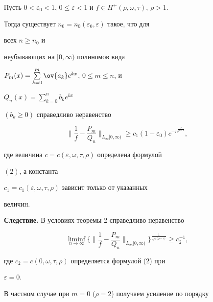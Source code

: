  


\begin{thm} 


Пусть $0<\varepsilon_0<1$, $0\le\varepsilon<1$ и $f\in 


H^+(\rho,\omega,\tau)$, $\rho>1$. 


Тогда существует $n_0=n_0(\varepsilon_0,\varepsilon)$ такое, что для 


всех $n\ge n_0$ и 


неубывающих на $[0,\infty)$ полиномов вида 


$P_m(x)=\sum\limits^m_{k=0}\ov{a_k}e^{kx}$, $0\le m\le n$, и 


$Q_n(x)=\sum\limits^n_{k=0}b_k e^{kx}$ 


$(b_k\ge0)$ справедливо неравенство 


\begin{equation} 


\bigg\|\frac{1}{f}-\frac{P_m}{Q_n}\bigg\|_{L_\infty[0,\infty)} 


\ge c_1(1-\varepsilon_0)c^{-n^{\frac{\rho}{\rho-1}}}, 


\end{equation} 


где величина $c=c(\varepsilon,\omega,\tau,\rho)$ определена формулой 


$(2)$, а константа 


$c_1=c_1(\varepsilon,\omega,\tau,\rho)$ зависит только от указанных 


величин. 


\end{thm} 


 


{\bf Следствие.} В условиях теоремы 2 справедливо неравенство 


$$ 


\liminf_{n\to\infty}\bigg\{ 


\bigg\|\frac{1}{f}-\frac{P_m}{Q_n}\bigg\|_{L_\infty[0,\infty)} 


\bigg\}^{\frac{1}{n^{\rho/(\rho-1)}}}\ge c^{-1}_2, 


$$ 


где $c_2=c(0,\omega,\tau,\rho)$ определяется формулой (2) при 


$\varepsilon=0$. 


\medskip 


 


В частном случае при $m=0$ ($\rho=2$) получаем усиление по порядку 


